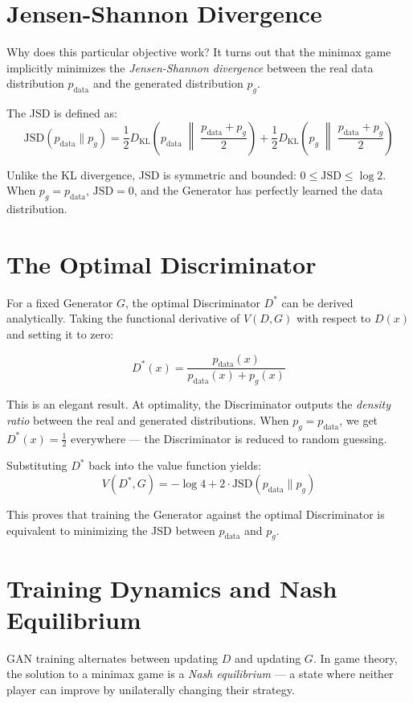 \documentclass[12pt]{article}
\begin{document}
\section{Jensen-Shannon Divergence}
Why does this particular objective work? It turns out that the minimax game implicitly minimizes the \textit{Jensen-Shannon divergence} between the real data distribution $p_{\text{data}}$ and the generated distribution $p_g$.

The JSD is defined as:
\begin{equation}
    \text{JSD}(p_{\text{data}} \| p_g) = \frac{1}{2} D_{\text{KL}}\left(p_{\text{data}} \;\middle\|\; \frac{p_{\text{data}} + p_g}{2}\right) + \frac{1}{2} D_{\text{KL}}\left(p_g \;\middle\|\; \frac{p_{\text{data}} + p_g}{2}\right)
\end{equation}

Unlike the KL divergence, JSD is symmetric and bounded: $0 \leq \text{JSD} \leq \log 2$. When $p_g = p_{\text{data}}$, $\text{JSD} = 0$, and the Generator has perfectly learned the data distribution.

\section{The Optimal Discriminator}
For a fixed Generator $G$, the optimal Discriminator $D^*$ can be derived analytically. Taking the functional derivative of $V(D, G)$ with respect to $D(x)$ and setting it to zero:

\begin{equation}
    D^*(x) = \frac{p_{\text{data}}(x)}{p_{\text{data}}(x) + p_g(x)}
\end{equation}

This is an elegant result. At optimality, the Discriminator outputs the \textit{density ratio} between the real and generated distributions. When $p_g = p_{\text{data}}$, we get $D^*(x) = \frac{1}{2}$ everywhere --- the Discriminator is reduced to random guessing.

Substituting $D^*$ back into the value function yields:
\begin{equation}
    V(D^*, G) = -\log 4 + 2 \cdot \text{JSD}(p_{\text{data}} \| p_g)
\end{equation}

This proves that training the Generator against the optimal Discriminator is equivalent to minimizing the JSD between $p_{\text{data}}$ and $p_g$.

\section{Training Dynamics and Nash Equilibrium}
GAN training alternates between updating $D$ and updating $G$. In game theory, the solution to a minimax game is a \textit{Nash equilibrium} --- a state where neither player can improve by unilaterally changing their strategy.
\end{document}

